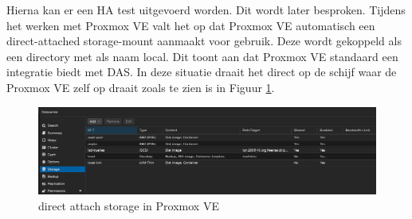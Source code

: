 Hierna kan er een HA test uitgevoerd worden. Dit wordt later besproken.
Tijdens het werken met Proxmox VE valt het op dat Proxmox VE automatisch een direct-attached storage-mount aanmaakt voor gebruik. Deze wordt gekoppeld als een directory met als naam local.
Dit toont aan dat Proxmox VE standaard een integratie biedt met DAS. In deze situatie draait het direct op de schijf waar de Proxmox VE zelf op draait zoals te zien is in Figuur \ref{fig:das-prox}.
\begin{figure}[H]
  \centering
  \includegraphics[width=1.1\textwidth]{../poc/das-proxmox.png}
  \caption{direct attach storage in Proxmox VE}
  \label{fig:das-prox}
\end{figure}


